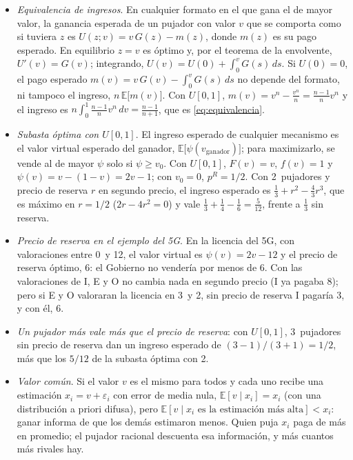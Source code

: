 \documentclass[11pt]{article}
\begin{document}
\begin{itemize}
\item \emph{Equivalencia de ingresos}. En cualquier formato en el que gana el de mayor valor, la ganancia esperada de un pujador con valor $v$ que se comporta como si tuviera $z$ es $U(z;v)=v\,G(z)-m(z)$, donde $m(z)$ es su pago esperado. En equilibrio $z=v$ es óptimo y, por el teorema de la envolvente, $U'(v)=G(v)$; integrando, $U(v)=U(0)+\int_0^vG(s)\,ds$. Si $U(0)=0$, el pago esperado $m(v)=v\,G(v)-\int_0^vG(s)\,ds$ no depende del formato, ni tampoco el ingreso, $n\,\mathbb{E}\big[m(v)\big]$. Con $U[0,1]$, $m(v)=v^n-\frac{v^n}{n}=\frac{n-1}{n}v^n$ y el ingreso es $n\int_0^1\frac{n-1}{n}v^n\,dv=\frac{n-1}{n+1}$, que es \eqref{eq:equivalencia}.\findemo
\item \emph{Subasta óptima con $U[0,1]$}. El ingreso esperado de cualquier mecanismo es el valor virtual esperado del ganador, $\mathbb{E}\big[\psi(v_{\mathrm{ganador}})\big]$\nocite{Myerson1981Optimal}; para maximizarlo, se vende al de mayor $\psi$ solo si $\psi\geq v_0$. Con $U[0,1]$, $F(v)=v$, $f(v)=1$ y $\psi(v)=v-(1-v)=2v-1$; con $v_0=0$, $p^R=1/2$. Con 2~pujadores y precio de reserva $r$ en segundo precio, el ingreso esperado es $\frac13+r^2-\frac43r^3$, que es máximo en $r=1/2$ ($2r-4r^2=0$) y vale $\frac13+\frac14-\frac16=\frac{5}{12}$, frente a $\frac13$ sin reserva.\findemo
\item \emph{Precio de reserva en el ejemplo del 5G}. En la licencia del 5G, con valoraciones entre 0~y 12, el valor virtual es $\psi(v)=2v-12$ y el precio de reserva óptimo, 6: el Gobierno no vendería por menos de 6. Con las valoraciones de \textup{I}, E y O no cambia nada en segundo precio (\textup{I} ya pagaba 8); pero si E y O valoraran la licencia en 3~y 2, sin precio de reserva \textup{I} pagaría 3, y con él, 6.
\item \emph{Un pujador más vale más que el precio de reserva}\nocite{BulowKlemperer1996Auctions}: con $U[0,1]$, 3~pujadores sin precio de reserva dan un ingreso esperado de $(3-1)/(3+1)=1/2$, más que los $5/12$ de la subasta óptima con 2.
\item \emph{Valor común}. Si el valor $v$ es el mismo para todos y cada uno recibe una estimación $x_i=v+\varepsilon_i$ con error de media nula, $\mathbb{E}[v\mid x_i]=x_i$ (con una distribución a priori difusa), pero $\mathbb{E}[v\mid x_i \text{ es la estimación más alta}]<x_i$: ganar informa de que los demás estimaron menos. Quien puja $x_i$ paga de más en promedio; el pujador racional descuenta esa información, y más cuantos más rivales hay\nocite{Wilson1977Bidding}.
\end{itemize}
\end{document}
